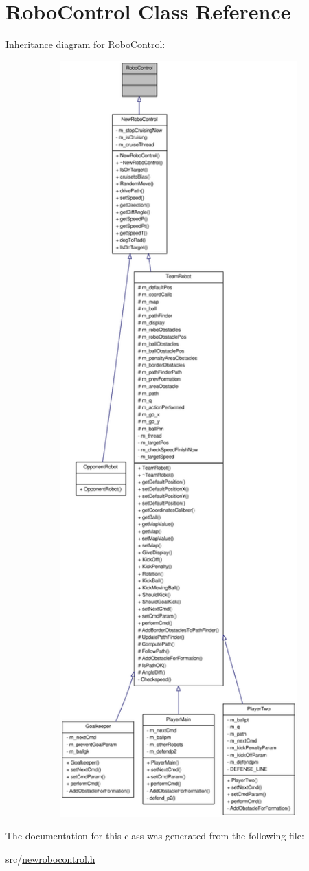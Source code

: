 \hypertarget{classRoboControl}{
\section{RoboControl Class Reference}
\label{classRoboControl}
}


Inheritance diagram for RoboControl:\nopagebreak
\begin{figure}[H]
\begin{center}
\leavevmode
\includegraphics[width=400pt]{classRoboControl__inherit__graph}
\end{center}
\end{figure}


The documentation for this class was generated from the following file:\begin{DoxyCompactItemize}
\item 
src/\hyperlink{newrobocontrol_8h}{newrobocontrol.h}\end{DoxyCompactItemize}
